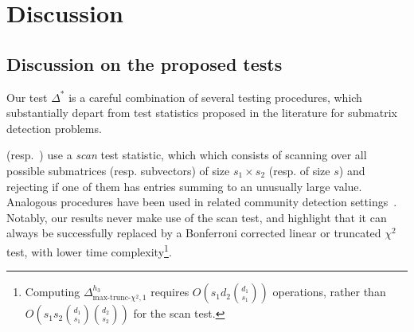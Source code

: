 \documentclass{article}
\newcommand{\chisqmax}{\text{max-trunc-$\chi^2$}}
\newcommand{\pa}[1]{{\color{red}Parker: #1}}
\theoremstyle{remark}
\begin{document}
%     
% 

    

\section{Discussion}\label{sec_discussion}

\subsection{Discussion on the proposed tests}\label{sec_discussion_tests}
Our test $\Delta^*$ is a careful combination of several testing procedures, which substantially depart from test statistics proposed in the literature for submatrix detection problems. 

\cite{butucea2013detection} (resp.~\cite{baraud2002non}) use a \textit{scan} test statistic, which which consists of scanning over all possible submatrices (resp. subvectors) of size $s_1 \times s_2$ (resp. of size $s$) and rejecting if one of them has entries summing to an unusually large value. 
Analogous procedures have been used in related community detection settings~\citep{arias2014community,rotenberg2024planted}. 
Notably, our results never make use of the scan test, and highlight that it can always be successfully replaced by a Bonferroni corrected linear or truncated $\chi^2$ test, with lower time complexity\footnote{ Computing $\Delta^{h_3}_{\chisqmax, 1}$ requires $O(s_1d_2{d_1 \choose s_1})$ operations, rather than $O(s_1s_2{d_1 \choose s_1}{d_2 \choose s_2})$ for the scan test. }. 
\end{document}
